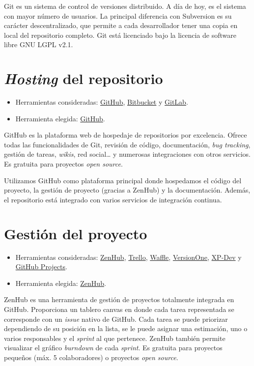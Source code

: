 Git es un sistema de control de versiones distribuido. A día de hoy, es
el sistema con mayor número de usuarios. La principal diferencia con
Subversion es su carácter descentralizado, que permite a cada
desarrollador tener una copia en local del repositorio completo. Git
está licenciado bajo la licencia de software libre GNU LGPL v2.1.

\section{\emph{Hosting} del repositorio}\label{hosting-del-repositorio}

\begin{itemize}
\tightlist
\item
  Herramientas consideradas: \href{https://github.com/}{GitHub},
  \href{https://bitbucket.org/}{Bitbucket} y
  \href{https://gitlab.com/}{GitLab}.
\item
  Herramienta elegida: \href{https://github.com/}{GitHub}.
\end{itemize}

GitHub es la plataforma web de hospedaje de repositorios por excelencia.
Ofrece todas las funcionalidades de Git, revisión de código,
documentación, \emph{bug tracking}, gestión de tareas, \emph{wikis}, red
social\ldots{} y numerosas integraciones con otros servicios. Es
gratuita para proyectos \emph{open source}.

Utilizamos GitHub como plataforma principal donde hospedamos el código
del proyecto, la gestión de proyecto (gracias a ZenHub) y la
documentación. Además, el repositorio está integrado con varios
servicios de integración continua.

\section{Gestión del proyecto}\label{gestion-del-proyecto}

\begin{itemize}
\tightlist
\item
  Herramientas consideradas: \href{https://www.zenhub.com/}{ZenHub},
  \href{https://trello.com/}{Trello}, \href{https://waffle.io/}{Waffle},
  \href{https://www.versionone.com/}{VersionOne},
  \href{https://xp-dev.com/}{XP-Dev} y \href{https://github.com/}{GitHub
  Projects}.
\item
  Herramienta elegida: \href{https://www.zenhub.com/}{ZenHub}.
\end{itemize}

ZenHub es una herramienta de gestión de proyectos totalmente integrada
en GitHub. Proporciona un tablero canvas en donde cada tarea
representada se corresponde con un \emph{issue} nativo de GitHub. Cada
tarea se puede priorizar dependiendo de su posición en la lista, se le
puede asignar una estimación, uno o varios responsables y el
\emph{sprint} al que pertenece. ZenHub también permite visualizar el
gráfico \emph{burndown} de cada \emph{sprint}. Es gratuita para
proyectos pequeños (máx. 5 colaboradores) o proyectos \emph{open
source}.


